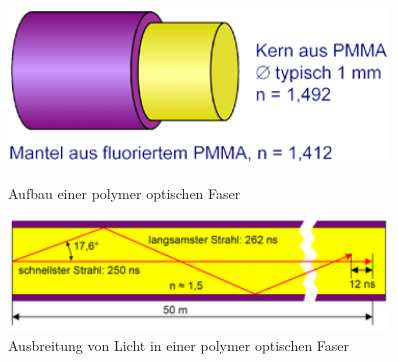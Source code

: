 \begin{figure}[h]
    \begin{center}
        \begin{minipage}[t]{0.4\textwidth}
            \begin{center}
                \includegraphics[width=0.9\textwidth]{Bilder/Optische_Wellenleiter_Die_Polymer_Optische_Faser/Funktionsweise/pofprinzip.png}
                \caption[Aufbau einer polymer optischen Faser \newline \url{http://www.pofac.fh-nuernberg.de/pofac/de/was_sind_pof/images/pof_prinzip.png} (zuletzt aufgerufen am 19.09.2015)]{Aufbau einer polymer optischen Faser}
                \label{fig:pofprinzip}
            \end{center}
        \end{minipage}
        \hspace{0.025\textwidth}
        \begin{minipage}[t]{0.4\textwidth}
            \begin{center}
                \includegraphics[width=0.9\textwidth]{Bilder/Optische_Wellenleiter_Die_Polymer_Optische_Faser/Funktionsweise/poflichtausbreitung.png}
                \caption[Ausbreitung von Licht in einer polymer optischen Faser \newline \url{http://www.pofac.info/typo3temp/pics/7eee584dce.jpg} (zuletzt aufgerufen am 19.09.2015)]{Ausbreitung von Licht in einer polymer optischen Faser}
                \label{fig:poflichtausbreitung}
            \end{center}
        \end{minipage}
    \end{center}
\end{figure}
